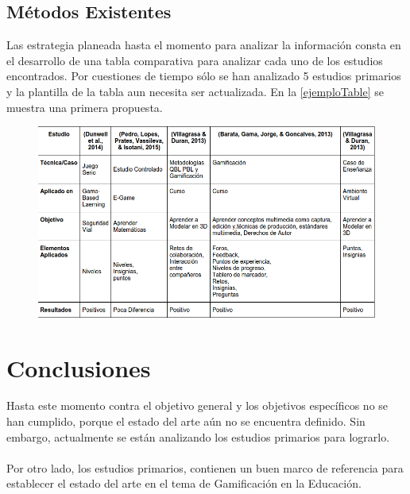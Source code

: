 \documentclass{report}
\begin{document}
            \subsection{Métodos Existentes}
            Las estrategia planeada hasta el momento para analizar la información consta en el desarrollo de una tabla comparativa para analizar cada uno de los estudios encontrados. Por cuestiones de tiempo sólo se han analizado 5 estudios primarios y la plantilla de la tabla aun necesita ser actualizada. En la \autoref{ejemploTable} se muestra una primera propuesta.
            
            \begin{figure}
            	\begin{center}
            		\includegraphics[scale=0.4]{images/1document/comparative.png}
            	\end{center}
            \end{figure}
        
    \section{Conclusiones}
    
    Hasta este momento contra el objetivo general y los objetivos específicos no se han cumplido, porque el estado del arte aún no se encuentra definido. Sin embargo, actualmente se están analizando los estudios primarios para lograrlo.\\~\\
    Por otro lado, los estudios primarios, contienen un buen marco de referencia para establecer el estado del arte en el tema de Gamificación en la Educación.\\
    
    \newpage
\end{document}
